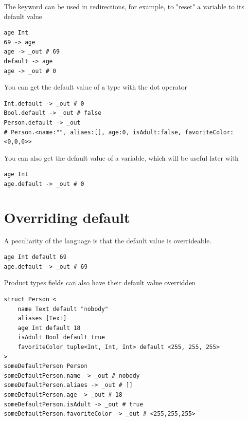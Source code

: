 The  keyword can be used in redirections, for example, to "reset"
a variable to its default value

\begin{verbatim}
age Int
69 -> age
age -> _out # 69
default -> age
age -> _out # 0
\end{verbatim}

You can get the default value of a type with the dot operator

\begin{verbatim}
Int.default -> _out # 0
Bool.default -> _out # false
Person.default -> _out
# Person.<name:"", aliaes:[], age:0, isAdult:false, favoriteColor:<0,0,0>>
\end{verbatim}

You can also get the default value of a variable, which will be useful later
with 

\begin{verbatim}
age Int
age.default -> _out # 0
\end{verbatim}

\section{Overriding default}
\label{sec:default_override}

A peculiarity of the language is that the default value is overrideable.


\begin{verbatim}
age Int default 69
age.default -> _out # 69
\end{verbatim}

Product types fields can also have their default value overridden

\begin{listing}
\label{lst:product_type_zero_value_overridden}
	\caption{
		Example of a variable being initialized with the overridden zero value
		of its product type
	}\begin{verbatim}
struct Person <
	name Text default "nobody"
	aliases [Text]
	age Int default 18
	isAdult Bool default true
	favoriteColor tuple<Int, Int, Int> default <255, 255, 255>
>
someDefaultPerson Person
someDefaultPerson.name -> _out # nobody
someDefaultPerson.aliaes -> _out # []
someDefaultPerson.age -> _out # 18
someDefaultPerson.isAdult -> _out # true
someDefaultPerson.favoriteColor -> _out # <255,255,255>
	\end{verbatim}
\end{listing}

